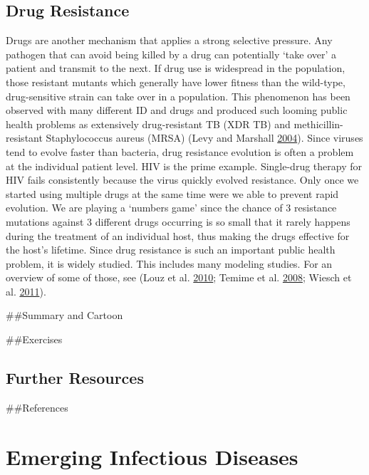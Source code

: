 \documentclass[]{book}
\theoremstyle{definition}
\theoremstyle{definition}
\theoremstyle{definition}
\theoremstyle{remark}
\begin{document}
\hypertarget{drug-resistance}{%
\section{Drug Resistance}\label{drug-resistance}}

Drugs are another mechanism that applies a strong selective pressure.
Any pathogen that can avoid being killed by a drug can potentially `take
over' a patient and transmit to the next. If drug use is widespread in
the population, those resistant mutants which generally have lower
fitness than the wild-type, drug-sensitive strain can take over in a
population. This phenomenon has been observed with many different ID and
drugs and produced such looming public health problems as extensively
drug-resistant TB (XDR TB) and methicillin-resistant Staphylococcus
aureus (MRSA) (Levy and Marshall \protect\hyperlink{ref-levy04}{2004}).
Since viruses tend to evolve faster than bacteria, drug resistance
evolution is often a problem at the individual patient level. HIV is the
prime example. Single-drug therapy for HIV fails consistently because
the virus quickly evolved resistance. Only once we started using
multiple drugs at the same time were we able to prevent rapid evolution.
We are playing a `numbers game' since the chance of 3 resistance
mutations against 3 different drugs occurring is so small that it rarely
happens during the treatment of an individual host, thus making the
drugs effective for the host's lifetime. Since drug resistance is such
an important public health problem, it is widely studied. This includes
many modeling studies. For an overview of some of those, see (Louz et
al. \protect\hyperlink{ref-louz10}{2010}; Temime et al.
\protect\hyperlink{ref-temime08}{2008}; Wiesch et al.
\protect\hyperlink{ref-wiesch11}{2011}).

\#\#Summary and Cartoon

\#\#Exercises

\hypertarget{further-resources-8}{%
\section{Further Resources}\label{further-resources-8}}

\#\#References

\hypertarget{emerging-infectious-diseases}{%
\chapter{Emerging Infectious
Diseases}\label{emerging-infectious-diseases}}
\end{document}
